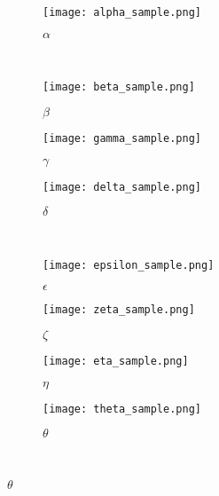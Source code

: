 \begin{figure}
	\centering
	\begin{subfigure}[b]{0.2\textwidth}
                \texttt{[image: alpha\_sample.png]}
                \caption{$\alpha$}
                \label{fig:alpha_sample}
        \end{subfigure}%
        ~ %
        \begin{subfigure}[b]{0.2\textwidth}
                \texttt{[image: beta\_sample.png]}
                \caption{$\beta$}
                \label{fig:beta_sample}
        \end{subfigure}
        \begin{subfigure}[b]{0.2\textwidth}
                \texttt{[image: gamma\_sample.png]}
                \caption{$\gamma$}
                \label{fig:gamma_sample}
        \end{subfigure}
        \begin{subfigure}[b]{0.2\textwidth}
                \texttt{[image: delta\_sample.png]}
                \caption{$\delta$}
                \label{fig:delta_sample}
        \end{subfigure} \hfill \\
         \begin{subfigure}[b]{0.2\textwidth}
                \texttt{[image: epsilon\_sample.png]}
                \caption{$\epsilon$}
                \label{fig:epsilon_sample}
        \end{subfigure}
        \begin{subfigure}[b]{0.2\textwidth}
                \texttt{[image: zeta\_sample.png]}
                \caption{$\zeta$}
                \label{fig:zeta_sample}
        \end{subfigure}
        \begin{subfigure}[b]{0.2\textwidth}
                \texttt{[image: eta\_sample.png]}
                \caption{$\eta$}
                \label{fig:eta_sample}
        \end{subfigure}
        \begin{subfigure}[b]{0.2\textwidth}
                \texttt{[image: theta\_sample.png]}
                \caption{$\theta$}
                \label{fig:theta_sample}
        \end{subfigure} \hfill \\

\end{figure}
